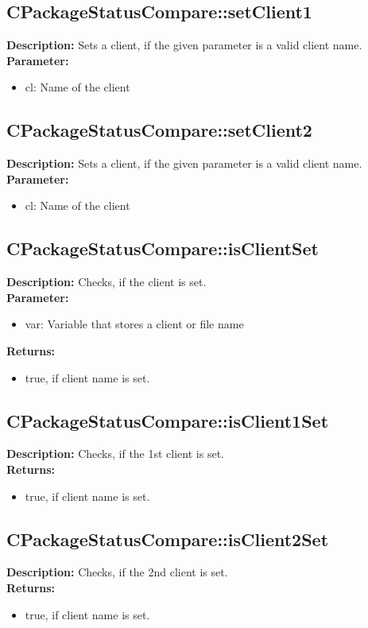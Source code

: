 \subsection{CPackageStatusCompare::setClient1}
\textbf{Description:} Sets a client, if the given parameter is a valid client name.\\
\textbf{Parameter:}
\begin{itemize}
\item cl: Name of the client
\end{itemize}

\subsection{CPackageStatusCompare::setClient2}
\textbf{Description:} Sets a client, if the given parameter is a valid client name.\\
\textbf{Parameter:}
\begin{itemize}
\item cl: Name of the client
\end{itemize}

\subsection{CPackageStatusCompare::isClientSet}
\textbf{Description:} Checks, if the client is set.\\
\textbf{Parameter:}
\begin{itemize}
\item var: Variable that stores a client or file name
\end{itemize}
\textbf{Returns:}
\begin{itemize}
\item true, if client name is set.
\end{itemize}

\subsection{CPackageStatusCompare::isClient1Set}
\textbf{Description:} Checks, if the 1st client is set.\\
\textbf{Returns:}
\begin{itemize}
\item true, if client name is set.
\end{itemize}

\subsection{CPackageStatusCompare::isClient2Set}
\textbf{Description:} Checks, if the 2nd client is set.\\
\textbf{Returns:}
\begin{itemize}
\item true, if client name is set.
\end{itemize}

